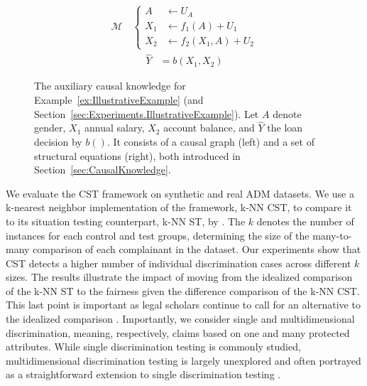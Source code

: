 %
\begin{figure}[t]
\begin{minipage}{.45\linewidth}
\begin{figure}[H]
\centering
\end{figure}
\end{minipage}
\begin{minipage}{.45\linewidth}
\begin{align*}
\mathcal{M} \, & 
\begin{cases}
    A & \leftarrow U_{A} \\
    X_1 & \leftarrow f_1(A)  + U_1 \\
    X_2 & \leftarrow f_2(X_1, A) + U_2
\end{cases}
\end{align*}
\begin{align*}
    \widehat{Y} & = b(X_1, X_2) 
\end{align*}
\end{minipage}
\caption{The auxiliary causal knowledge for Example~\ref{ex:IllustrativeExample} (and Section~\ref{sec:Experiments.IllustrativeExample}). Let $A$ denote gender, $X_1$ annual salary, $X_2$ account balance, and $\widehat{Y}$ the loan decision by $b()$. It consists of a causal graph (left) and a set of structural equations (right), both introduced in Section~\ref{sec:CausalKnowledge}.}
\label{fig:KarimiV2}
\end{figure}
% 

We evaluate the CST framework on synthetic and real ADM datasets.
We use a k-nearest neighbor implementation of the framework, k-NN CST, to compare it to its situation testing counterpart, k-NN ST, by \textcite{Thanh_KnnSituationTesting2011}.
The $k$ denotes the number of instances for each control and test groups, determining the size of the many-to-many comparison of each complainant in the dataset.
Our experiments show that CST detects a higher number of individual discrimination cases across different $k$ sizes. 
The results illustrate the impact of moving from the idealized comparison of the k-NN ST to the fairness given the difference comparison of the k-NN CST.
This last point is important as legal scholars continue to call for an alternative to the idealized comparison \parencite{Kohler2018CausalEddie}.
Importantly, we consider single and multidimensional discrimination, meaning, respectively, claims based on one and many protected attributes.
While single discrimination testing is commonly studied, multidimensional discrimination testing is largely unexplored and often portrayed as a straightforward extension to single discrimination testing \parencite{Xenidis2020_TunningEULaw}.

